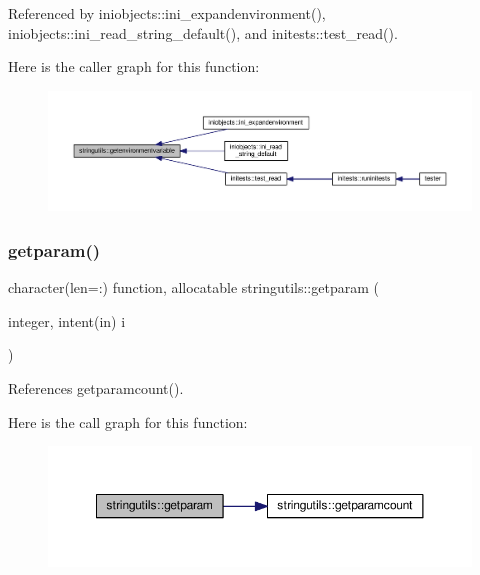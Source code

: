 Referenced by iniobjects\+::ini\+\_\+expandenvironment(), iniobjects\+::ini\+\_\+read\+\_\+string\+\_\+default(), and initests\+::test\+\_\+read().

Here is the caller graph for this function\+:
\nopagebreak
\begin{figure}[H]
\begin{center}
\leavevmode
\includegraphics[width=350pt]{namespacestringutils_a7869404fd42c1f41212cbd62a5e225f3_icgraph}
\end{center}
\end{figure}
\mbox{\label{namespacestringutils_a4553b9553b31c1e21fe6b70b54fde501}} 
\subsubsection{\texorpdfstring{getparam()}{getparam()}}
{\footnotesize\ttfamily character(len=\+:) function, allocatable stringutils\+::getparam (\begin{DoxyParamCaption}\item[{integer, intent(in)}]{i }\end{DoxyParamCaption})}



References getparamcount().

Here is the call graph for this function\+:
\nopagebreak
\begin{figure}[H]
\begin{center}
\leavevmode
\includegraphics[width=350pt]{namespacestringutils_a4553b9553b31c1e21fe6b70b54fde501_cgraph}
\end{center}
\end{figure}
\mbox{\label{namespacestringutils_a8837c1b537afbf19f8138389d9cdf434}} 
